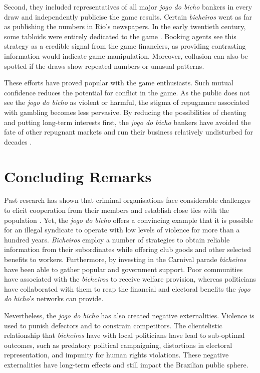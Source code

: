 \documentclass[a4paper,12pt]{article}
\begin{document}
Second, they included representatives of all major \emph{jogo do bicho} bankers in every draw and independently publicise the game results. Certain \emph{bicheiros} went as far as publishing the numbers in Rio's newspapers. In the early twentieth century, some tabloids were entirely dedicated to the game \citep[60]{magalhaes2005ganhou}. Booking agents see this strategy as a credible signal from the game financiers, as providing contrasting information would indicate game manipulation. Moreover, collusion can also be spotted if the draws show repeated numbers or unusual patterns.

These efforts have proved popular with the game enthusiasts. Such mutual confidence reduces the potential for conflict in the game. As the public does not see the \emph{jogo do bicho} as violent or harmful, the stigma of repugnance associated with gambling becomes less pervasive. By reducing the possibilities of cheating and putting long-term interests first, the \emph{jogo do bicho} bankers have avoided the fate of other repugnant markets and run their business relatively undisturbed for decades \citep[20]{da1999aguias}.



\section{Concluding Remarks}
\label{sec:conclusion3}

Past research has shown that criminal organisations face considerable challenges to elicit cooperation from their members and establish close ties with the population \citep[e.g.][]{gambetta1996sicilian,skarbek2011governance,skarbek2012prison,varese2001russian,varese2011mafias}. Yet, the \textit{jogo do bicho} offers a convincing example that it is possible for an illegal syndicate to operate with low levels of violence for more than a hundred years. \textit{Bicheiros} employ a number of strategies to obtain reliable information from their subordinates while offering club goods and other selected benefits to workers. Furthermore, by investing in the Carnival parade \textit{bicheiros} have been able to gather popular and government support. Poor communities have associated with the \textit{bicheiros} to receive welfare provision, whereas politicians have collaborated with them to reap the financial and electoral benefits the \textit{jogo do bicho}'s networks can provide.

Nevertheless, the \textit{jogo do bicho} has also created negative externalities. Violence is used to punish defectors and to constrain competitors. The clientelistic relationship that \textit{bicheiros} have with local politicians have lead to sub-optimal outcomes, such as predatory political campaigning, distortions in electoral representation, and impunity for human rights violations. These negative externalities have long-term effects and still impact the Brazilian public sphere.
\end{document}
